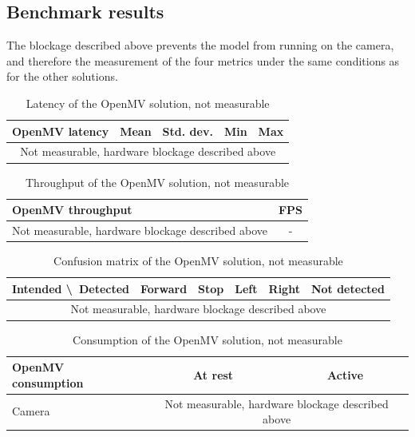 \documentclass[12pt,a4paper]{report}
\begin{document}
	\subsection*{Benchmark results}
	
	The blockage described above prevents the model from running on the camera, and therefore the measurement of the four metrics under the same conditions as for the other solutions.
	
	\begin{table}[H]
		\centering
		\small
		\begin{tabular}{lcccc}
			\toprule
			\textbf{OpenMV latency} & \textbf{Mean} & \textbf{Std. dev.} & \textbf{Min} & \textbf{Max} \\
			\midrule
			\multicolumn{5}{c}{Not measurable, hardware blockage described above} \\
			\bottomrule
		\end{tabular}
		\caption{Latency of the OpenMV solution, not measurable}
	\end{table}
	
	\begin{table}[H]
		\centering
		\small
		\begin{tabular}{lc}
			\toprule
			\textbf{OpenMV throughput} & \textbf{FPS} \\
			\midrule
			Not measurable, hardware blockage described above & - \\
			\bottomrule
		\end{tabular}
		\caption{Throughput of the OpenMV solution, not measurable}
	\end{table}
	
	\begin{table}[H]
		\centering
		\small
		\begin{tabular}{l|cccc|c}
			\toprule
			\textbf{Intended \textbackslash\ Detected} & \textbf{Forward} & \textbf{Stop} & \textbf{Left} & \textbf{Right} & \textbf{Not detected} \\
			\midrule
			\multicolumn{6}{c}{Not measurable, hardware blockage described above} \\
			\bottomrule
		\end{tabular}
		\caption{Confusion matrix of the OpenMV solution, not measurable}
	\end{table}
	
	\begin{table}[H]
		\centering
		\small
		\begin{tabular}{lcc}
			\toprule
			\textbf{OpenMV consumption} & \textbf{At rest} & \textbf{Active} \\
			\midrule
			Camera & \multicolumn{2}{c}{Not measurable, hardware blockage described above} \\
			\bottomrule
		\end{tabular}
		\caption{Consumption of the OpenMV solution, not measurable}
	\end{table}
	
\end{document}

